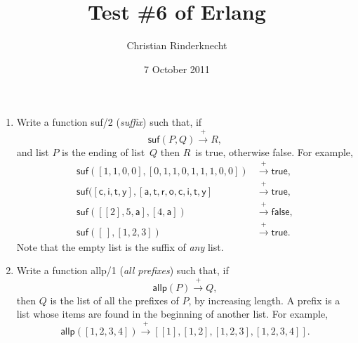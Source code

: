 \documentclass[11pt,a4paper]{article}
\title{Test \#6 of \textsf{Erlang}}
\author{Christian Rinderknecht}
\date{7 October 2011}
\newcommand\fun[1]{\textsf{#1}}
\begin{document}
\maketitle

\thispagestyle{empty}


\begin{enumerate}

  \item Write a function \fun{suf/2} (\emph{suffix}) such that, if
    \[\fun{suf}(P,Q) \xrightarrow{+} R,\]
    and list \(P\) is the ending of list~\(Q\) then \(R\)~is
    \fun{true}, otherwise \fun{false}. For example,
    \begin{align*}
      \fun{suf}([1,1,0,0],[0,1,1,0,1,1,1,0,0])
      &\xrightarrow{+} \fun{true},\\
      \fun{suf}([\fun{c},\fun{i},\fun{t},\fun{y}],
      [\fun{a}, \fun{t}, \fun{r}, \fun{o}, \fun{c}, \fun{i}, \fun{t},
        \fun{y}]
      & \xrightarrow{+} \fun{true},\\
      \fun{suf}([[2],5,\fun{a}],[4,\fun{a}])
      &\xrightarrow{+} \fun{false},\\
      \fun{suf}([\,],[1,2,3])
      &\xrightarrow{+} \fun{true}.
    \end{align*}
    Note that the empty list is the suffix of \emph{any} list.

  \item Write a function \fun{allp/1} (\emph{all prefixes}) such that,
    if
    \[\fun{allp}(P) \xrightarrow{+} Q,\] then \(Q\) is the list of all
    the prefixes of \(P\), by increasing length. A prefix is a list
    whose items are found in the beginning of another list. For
    example,
    \[\fun{allp}([1,2,3,4]) \xrightarrow{+}
          [[1],[1,2],[1,2,3],[1,2,3,4]].\]

\end{enumerate}
\end{document}
